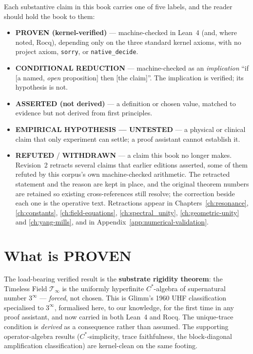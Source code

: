 Each substantive claim in this book carries one of five labels, and the reader
should hold the book to them:
\begin{itemize}
\item \textbf{PROVEN (kernel-verified)} --- machine-checked in Lean~4 (and, where
noted, Rocq), depending only on the three standard kernel axioms, with no
project axiom, \texttt{sorry}, or \texttt{native\_decide}.
\item \textbf{CONDITIONAL REDUCTION} --- machine-checked as an \emph{implication}
``if [a named, \emph{open} proposition] then [the claim]''. The implication is
verified; its hypothesis is not.
\item \textbf{ASSERTED (not derived)} --- a definition or chosen value, matched to
evidence but not derived from first principles.
\item \textbf{EMPIRICAL HYPOTHESIS --- UNTESTED} --- a physical or clinical claim
that only experiment can settle; a proof assistant cannot establish it.
\item \textbf{REFUTED} / \textbf{WITHDRAWN} --- a claim this book no longer
makes. Revision~2 retracts several claims that earlier editions asserted,
some of them refuted by this corpus's own machine-checked arithmetic. The
retracted statement and the reason are kept in place, and the original
theorem numbers are retained so existing cross-references still resolve; the
correction beside each one is the operative text. Retractions appear in
Chapters~\ref{ch:resonance}, \ref{ch:constants}, \ref{ch:field-equations},
\ref{ch:spectral_unity}, \ref{ch:geometric-unity} and \ref{ch:yang-mills},
and in Appendix~\ref{app:numerical-validation}.
\end{itemize}

\section*{What is PROVEN}

The load-bearing verified result is the \textbf{substrate rigidity theorem}: the
Timeless Field $\mathcal{T}_\infty$ is the uniformly hyperfinite $C^\ast$-algebra
of supernatural number $3^\infty$ --- \emph{forced}, not chosen. This is Glimm's
1960 UHF classification specialised to $3^\infty$, formalised here, to our
knowledge, for the first time in any proof assistant, and now carried in both
Lean~4 and Rocq. The unique-trace condition is \emph{derived} as a consequence
rather than assumed. The supporting operator-algebra results ($C^\ast$-simplicity,
trace faithfulness, the block-diagonal amplification classification) are
kernel-clean on the same footing.

